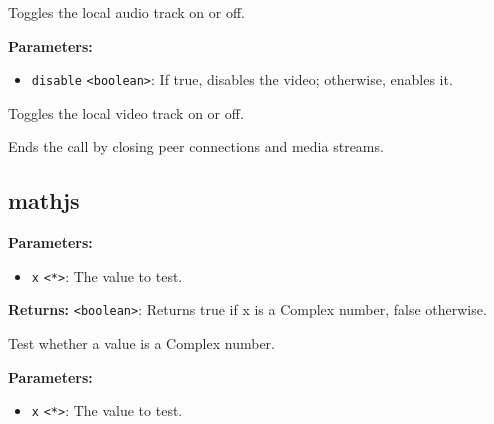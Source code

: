 \documentclass[12pt,a4paper]{article}
\begin{document}
\noindent Toggles the local audio track on or off.

\vspace{5mm}
\noindent {}


\noindent \textbf{Parameters:}
\begin{itemize}
  \item \texttt{disable} \texttt{<boolean>}: If true, disables the video; otherwise, enables it.
\end{itemize}

\noindent Toggles the local video track on or off.

\vspace{5mm}
\noindent {}


\noindent Ends the call by closing peer connections and media streams.


\subsection{mathjs}
\vspace{5mm}
\noindent {}


\noindent \textbf{Parameters:}
\begin{itemize}
  \item \texttt{x} \texttt{<*>}: The value to test.
\end{itemize}

\noindent \textbf{Returns:} \texttt{<boolean>}: Returns true if \textasciigrave{}x\textasciigrave{} is a Complex number, false otherwise.

\noindent Test whether a value is a Complex number.

\vspace{5mm}
\noindent {}


\noindent \textbf{Parameters:}
\begin{itemize}
  \item \texttt{x} \texttt{<*>}: The value to test.
\end{itemize}
\end{document}
